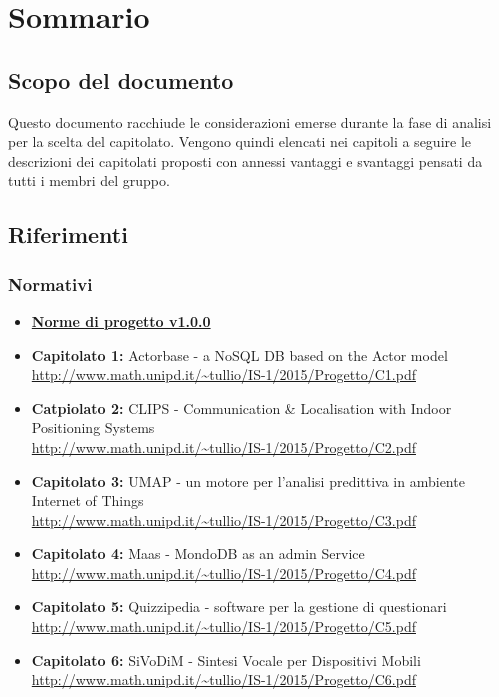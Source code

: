 \documentclass{scalatekids-article}
\begin{document}
\section{Sommario}
\subsection{Scopo del documento}
Questo documento racchiude le considerazioni emerse durante la fase di analisi per la scelta del capitolato.
Vengono quindi elencati nei capitoli a seguire le descrizioni dei capitolati proposti con annessi vantaggi e svantaggi pensati da tutti i membri del gruppo.
\prodPurpose
\glossExpl
\subsection{Riferimenti}
\subsubsection{Normativi}
\begin{itemize}
  \item \href{run:NormeDiProgetto_v0.0.1.text}{\textbf{Norme di progetto v1.0.0}}
\end{itemize}
\begin{itemize}
  \item \textbf{Capitolato 1:} Actorbase - a NoSQL DB based on the Actor model\\
  \url{http://www.math.unipd.it/~tullio/IS-1/2015/Progetto/C1.pdf}
  \item \textbf{Catpiolato 2:} CLIPS - Communication & Localisation with Indoor Positioning Systems\\
  \url{http://www.math.unipd.it/~tullio/IS-1/2015/Progetto/C2.pdf}
  \item \textbf{Capitolato 3:} UMAP - un motore per l'analisi predittiva in ambiente Internet of Things \\
  \url{http://www.math.unipd.it/~tullio/IS-1/2015/Progetto/C3.pdf}
  \item \textbf{Capitolato 4:} Maas - MondoDB as an admin Service \\
  \url{http://www.math.unipd.it/~tullio/IS-1/2015/Progetto/C4.pdf}
  \item \textbf{Capitolato 5:} Quizzipedia - software per la gestione di questionari \\
  \url{http://www.math.unipd.it/~tullio/IS-1/2015/Progetto/C5.pdf}
  \item \textbf{Capitolato 6:} SiVoDiM - Sintesi Vocale per Dispositivi Mobili \\
  \url{http://www.math.unipd.it/~tullio/IS-1/2015/Progetto/C6.pdf}
\end{itemize}
\end{document}
